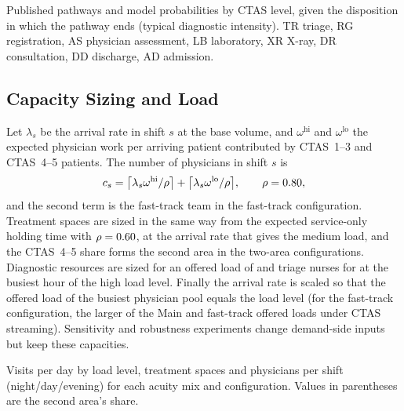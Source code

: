 \begin{table}[!htbp]
\centering
\caption{Published pathways and model probabilities by CTAS level, given the disposition in which the pathway ends (typical diagnostic intensity). TR triage, RG registration, AS physician assessment, LB laboratory, XR X-ray, DR consultation, DD discharge, AD admission.}
\label{tab:pathways}
\footnotesize
\begin{adjustbox}{max width=\linewidth}\end{adjustbox}
\end{table}

\subsection{Capacity Sizing and Load}

Let $\lambda_s$ be the arrival rate in shift $s$ at the base volume, and $\omega^{\text{hi}}$ and $\omega^{\text{lo}}$ the expected physician work per arriving patient contributed by CTAS~1--3 and CTAS~4--5 patients. The number of physicians in shift $s$ is
\begin{equation}
c_s=\big\lceil\lambda_s\omega^{\text{hi}}/\rho\big\rceil+\big\lceil\lambda_s\omega^{\text{lo}}/\rho\big\rceil,\qquad \rho=0.80,
\end{equation}
and the second term is the fast-track team in the fast-track configuration. Treatment spaces are sized in the same way from the expected service-only holding time with $\rho=0.60$, at the arrival rate that gives the medium load, and the CTAS~4--5 share forms the second area in the two-area configurations. Diagnostic resources are sized for an offered load of \DiagTarget{} and triage nurses for \TriageTarget{} at the busiest hour of the high load level. Finally the arrival rate is scaled so that the offered load of the busiest physician pool equals the load level (for the fast-track configuration, the larger of the Main and fast-track offered loads under CTAS streaming). Sensitivity and robustness experiments change demand-side inputs but keep these capacities.

\begin{table}[!htbp]
\centering
\caption{Visits per day by load level, treatment spaces and physicians per shift (night/day/evening) for each acuity mix and configuration. Values in parentheses are the second area's share.}
\label{tab:capacity}
\footnotesize
\setlength{\tabcolsep}{5pt}
\begin{adjustbox}{max width=\linewidth}\end{adjustbox}
\end{table}


